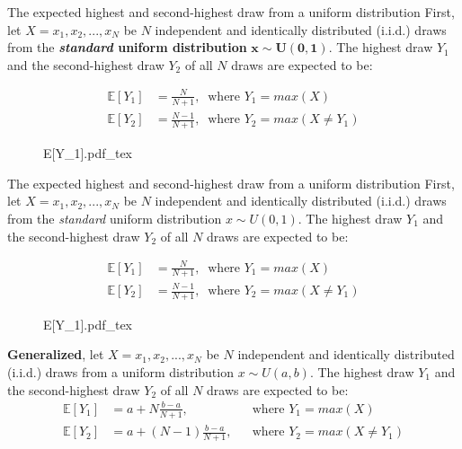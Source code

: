 \begin{frame}{The expected highest and second-highest draw from a uniform distribution}
    First, let $X=x_1,x_2,...,x_N$ be $N$ independent and identically distributed (i.i.d.) draws from the \textbf{\textit{standard} uniform distribution} $\bm{x\sim U(0, 1)}$. The highest draw $Y_1$ and the second-highest draw $Y_2$ of all $N$ draws are expected to be: \vspace{-8pt}
    \begin{multicols}{2}
      \begin{align*}
        \mathbb{E}[Y_1]&=\frac{N}{N+1},\ \text{ where }Y_1=max(X)\\
        \mathbb{E}[Y_2]&=\frac{N-1}{N+1},\ \text{ where }Y_2=max(X\neq Y_1)
      \end{align*}
      \vfill\null\columnbreak
      \begin{figure}[!h]
        \center
        \def\svgwidth{1.1\columnwidth}
        {E[Y_1].pdf_tex}
      \end{figure}
      \vfill\null
    \end{multicols}
\end{frame}
\begin{frame}{The expected highest and second-highest draw from a uniform distribution}
    First, let $X=x_1,x_2,...,x_N$ be $N$ independent and identically distributed (i.i.d.) draws from the \textit{standard} uniform distribution $x\sim U(0, 1)$. The highest draw $Y_1$ and the second-highest draw $Y_2$ of all $N$ draws are expected to be: \vspace{-10pt}
    \begin{multicols}{2}
      \begin{align*}
        \mathbb{E}[Y_1]&=\frac{N}{N+1},\ \text{ where }Y_1=max(X)\\
        \mathbb{E}[Y_2]&=\frac{N-1}{N+1},\ \text{ where }Y_2=max(X\neq Y_1)
      \end{align*}
      \vfill\null\columnbreak
      \begin{figure}[!h]
        \center
        \def\svgwidth{1.1\columnwidth}
        {E[Y_1].pdf_tex}
      \end{figure}
      \vfill\null
    \end{multicols} \vspace{-20pt}
    \textbf{Generalized}, let $X=x_1,x_2,...,x_N$ be $N$ independent and identically distributed (i.i.d.) draws from a uniform distribution $x\sim U(a, b)$. The highest draw $Y_1$ and the second-highest draw $Y_2$ of all $N$ draws are expected to be:
    \begin{align*}
      \mathbb{E}[Y_1]&=a+N\frac{b-a}{N+1},&&\text{where }Y_1=max(X)\\
      \mathbb{E}[Y_2]&=a+(N-1)\frac{b-a}{N+1},&&\text{where }Y_2=max(X\neq Y_1)
    \end{align*}
\end{frame}
